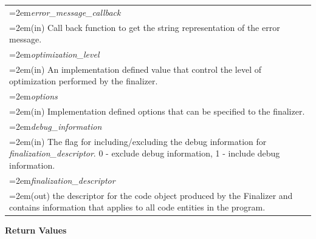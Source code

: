 \documentclass[final]{book}
\newcommand{\hsaarg}[1]{\textit{#1}}
\begin{document}
\begin{longtable}{@{}>{\hangindent=2em}p{\textwidth}}
\hsaarg{error_message_callback}\\\hspace{2em}(in) Call back function to get the string representation of the error message.\\[2mm]
\hsaarg{optimization_level}\\\hspace{2em}(in) An implementation defined value that control the level of optimization performed by the finalizer.\\[2mm]
\hsaarg{options}\\\hspace{2em}(in) Implementation defined options that can be specified to the finalizer.\\[2mm]
\hsaarg{debug_information}\\\hspace{2em}(in) The flag for including/excluding the debug information for \textit{finalization_descriptor}. 0 - exclude debug information, 1 - include debug information.\\[2mm]
\hsaarg{finalization_descriptor}\\\hspace{2em}(out) the descriptor for the code object produced by the Finalizer and contains information that applies to all code entities in the program.
\end{longtable}
\vspace{-5mm}\noindent\textbf{Return Values}\\[-6mm]
\end{document}
